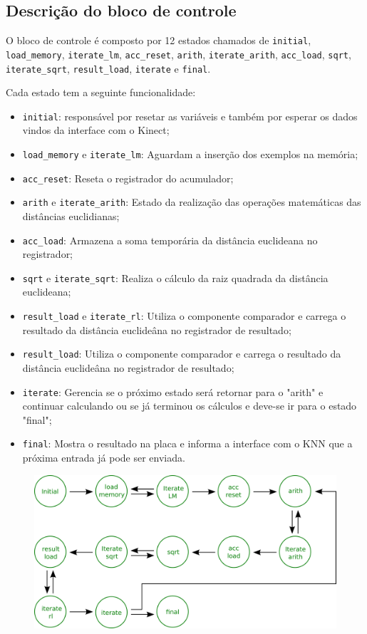 \subsection{Descrição do bloco de controle}

O bloco de controle é composto por 12 estados chamados de \verb|initial|,
\verb|load_memory|, \verb|iterate_lm|, \verb|acc_reset|,
\verb|arith|, \verb|iterate_arith|, \verb|acc_load|, \verb|sqrt|,
\verb|iterate_sqrt|, \verb|result_load|, \verb|iterate| e 
\verb|final|.

Cada estado tem a seguinte funcionalidade:

\begin{itemize}
\item \verb|initial|: responsável por resetar as variáveis e também por esperar os dados vindos da interface com o Kinect;
\item \verb|load_memory| e \verb|iterate_lm|: Aguardam a inserção dos exemplos na memória;
\item \verb|acc_reset|: Reseta o registrador do acumulador;
\item \verb|arith| e \verb|iterate_arith|: Estado da realização das operações matemáticas das distâncias euclidianas;
\item \verb|acc_load|: Armazena a soma temporária da distância euclideana no registrador;
\item \verb|sqrt| e \verb|iterate_sqrt|: Realiza o cálculo da raiz quadrada da distância euclideana;
\item \verb|result_load| e \verb|iterate_rl|: Utiliza o componente comparador e carrega o resultado da distância euclideâna no registrador de resultado;
\item \verb|result_load|: Utiliza o componente comparador e carrega o resultado da distância euclideâna no registrador de resultado;
\item \verb|iterate|: Gerencia se o próximo estado será retornar para o "arith" e continuar calculando ou se já terminou os cálculos 
e deve-se ir para o estado "final";
\item \verb|final|: Mostra o resultado na placa e informa a interface com o KNN que a próxima entrada já pode ser enviada.
\end{itemize}

\begin{figure}[!ht]
\centering
\includegraphics[scale=0.2]{img/control_unit.png}
\end{figure}

